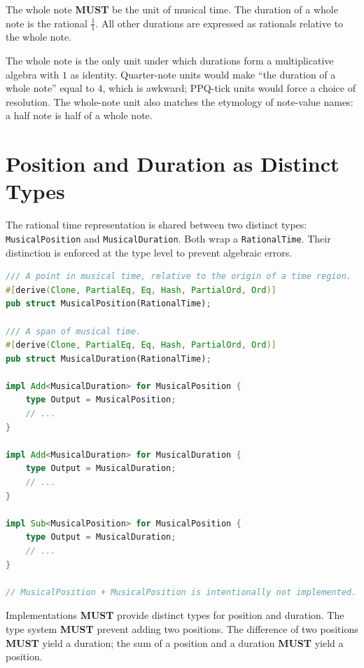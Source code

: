 \documentclass[11pt,letterpaper]{report}
\newcounter{requirement}[chapter]
\newcommand{\MUST}{\textbf{MUST}}
\begin{document}
\begin{requirement}
  \label{req:time:whole-note-unit}
  The whole note \MUST{} be the unit of musical time. The duration of
  a whole note is the rational $\frac{1}{1}$. All other durations are
  expressed as rationals relative to the whole note.
\end{requirement}

\begin{rationale}
  The whole note is the only unit under which durations form a
  multiplicative algebra with $1$ as identity. Quarter-note units would
  make ``the duration of a whole note'' equal to $4$, which is
  awkward; PPQ-tick units would force a choice of resolution. The
  whole-note unit also matches the etymology of note-value names: a
  half note is half of a whole note.
\end{rationale}

\section{Position and Duration as Distinct Types}
\label{sec:time:newtypes}

The rational time representation is shared between two distinct types:
\texttt{MusicalPosition} and \texttt{MusicalDuration}. Both wrap a
\texttt{RationalTime}. Their distinction is enforced at the type level
to prevent algebraic errors.

\begin{lstlisting}[language=Rust]
/// A point in musical time, relative to the origin of a time region.
#[derive(Clone, PartialEq, Eq, Hash, PartialOrd, Ord)]
pub struct MusicalPosition(RationalTime);

/// A span of musical time.
#[derive(Clone, PartialEq, Eq, Hash, PartialOrd, Ord)]
pub struct MusicalDuration(RationalTime);

impl Add<MusicalDuration> for MusicalPosition {
    type Output = MusicalPosition;
    // ...
}

impl Add<MusicalDuration> for MusicalDuration {
    type Output = MusicalDuration;
    // ...
}

impl Sub<MusicalPosition> for MusicalPosition {
    type Output = MusicalDuration;
    // ...
}

// MusicalPosition + MusicalPosition is intentionally not implemented.
\end{lstlisting}

\begin{requirement}
  \label{req:time:position-duration-types}
  Implementations \MUST{} provide distinct types for position and
  duration. The type system \MUST{} prevent adding two positions. The
  difference of two positions \MUST{} yield a duration; the sum of a
  position and a duration \MUST{} yield a position.
\end{requirement}
\end{document}
